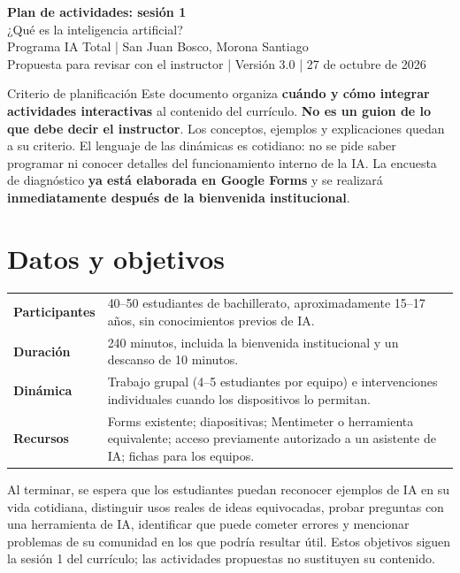 \documentclass[11pt,a4paper]{article}
\begin{document}
\begin{center}
{\Huge\sffamily\bfseries Plan de actividades: sesión 1}\\[6pt]
{\Large ¿Qué es la inteligencia artificial?}\\[5pt]
{\large Programa IA Total | San Juan Bosco, Morona Santiago}\\[8pt]
\textcolor{gris}{Propuesta para revisar con el instructor | Versión 3.0 | 27 de octubre de 2026}
\end{center}
\begin{actividad}{Criterio de planificación}
Este documento organiza \textbf{cuándo y cómo integrar actividades interactivas} al contenido del currículo. \textbf{No es un guion de lo que debe decir el instructor}. Los conceptos, ejemplos y explicaciones quedan a su criterio. El lenguaje de las dinámicas es cotidiano: no se pide saber programar ni conocer detalles del funcionamiento interno de la IA. La encuesta de diagnóstico \textbf{ya está elaborada en Google Forms} y se realizará \textbf{inmediatamente después de la bienvenida institucional}.
\end{actividad}
\section{Datos y objetivos}
\begin{tabularx}{\textwidth}{@{}lX@{}}
\toprule
\textbf{Participantes} & 40--50 estudiantes de bachillerato, aproximadamente 15--17 años, sin conocimientos previos de IA.\\
\textbf{Duración} & 240 minutos, incluida la bienvenida institucional y un descanso de 10 minutos.\\
\textbf{Dinámica} & Trabajo grupal (4--5 estudiantes por equipo) e intervenciones individuales cuando los dispositivos lo permitan.\\
\textbf{Recursos} & Forms existente; diapositivas; Mentimeter o herramienta equivalente; acceso previamente autorizado a un asistente de IA; fichas para los equipos.\\
\bottomrule
\end{tabularx}

\medskip
Al terminar, se espera que los estudiantes puedan reconocer ejemplos de IA en su vida cotidiana, distinguir usos reales de ideas equivocadas, probar preguntas con una herramienta de IA, identificar que puede cometer errores y mencionar problemas de su comunidad en los que podría resultar útil. Estos objetivos siguen la sesión 1 del currículo; las actividades propuestas no sustituyen su contenido.
\end{document}
